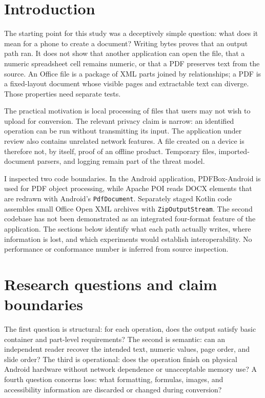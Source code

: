 \documentclass[10pt,letterpaper]{article}
\begin{document}
\vspace{0.8em}

\section{Introduction}

The starting point for this study was a deceptively simple question: what does it mean for a phone to create a document? Writing bytes proves that an output path ran. It does not show that another application can open the file, that a numeric spreadsheet cell remains numeric, or that a PDF preserves text from the source. An Office file is a package of XML parts joined by relationships; a PDF is a fixed-layout document whose visible pages and extractable text can diverge. Those properties need separate tests.

The practical motivation is local processing of files that users may not wish to upload for conversion. The relevant privacy claim is narrow: an identified operation can be run without transmitting its input. The application under review also contains unrelated network features. A file created on a device is therefore not, by itself, proof of an offline product. Temporary files, imported-document parsers, and logging remain part of the threat model.

I inspected two code boundaries. In the Android application, PDFBox-Android is used for PDF object processing, while Apache POI reads DOCX elements that are redrawn with Android's \texttt{PdfDocument}. Separately staged Kotlin code assembles small Office Open XML archives with \texttt{ZipOutputStream}. The second codebase has not been demonstrated as an integrated four-format feature of the application. The sections below identify what each path actually writes, where information is lost, and which experiments would establish interoperability. No performance or conformance number is inferred from source inspection.

\section{Research questions and claim boundaries}

The first question is structural: for each operation, does the output satisfy basic container and part-level requirements? The second is semantic: can an independent reader recover the intended text, numeric values, page order, and slide order? The third is operational: does the operation finish on physical Android hardware without network dependence or unacceptable memory use? A fourth question concerns loss: what formatting, formulas, images, and accessibility information are discarded or changed during conversion?
\end{document}
